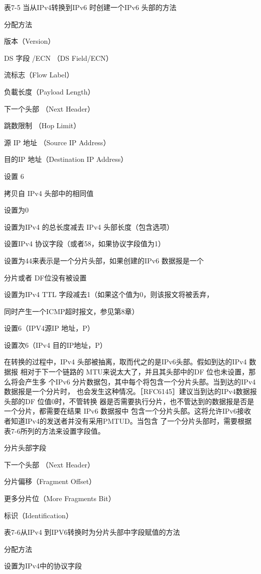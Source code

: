 表7-5 当从IPv4转换到IPv6 时创建一个IPv6 头部的方法

分配方法

版本（Version）

DS 字段 /ECN （DS Field/ECN）

流标志（Flow Label）

负載长度（Payload Length）

下一个头部 （Next Header）

跳数限制 （Hop Limit）

源 IP 地址 （Source IP Address）

目的IP 地址（Destination IP Address）

设置 6

拷贝自 IPv4 头部中的相同值

设置为0

设置为IPv4 的总长度减去 IPv4 头部长度（包含选项）

设置IPv4 协议字段（或者58，如果协议字段值为1）

设置为44来表示是一个分片头部，如果创建的IPv6 数据报是一个

分片或者 DF位没有被设置

设置为IPv4 TTL 字段减去1（如果这个值为0，则该报文将被丢弃，

同时产生一个ICMP超时报文，参见第8章）

设置6（IPV4源IP 地址，P）

设置次6（IPv4 目的IP地址，P）

在转换的过程中，IPv4 头部被抽离，取而代之的是IPv6头部。假如到达的IPv4 数据报
相对于下一个链路的 MTU来说太大了，并且其头部中的DF 位也未设置，那么将会产生多
个IPv6 分片数据包，其中每个将包含一个分片头部。当到达的IPv4数据报是一个分片时，
也会发生这种情况。［RFC6145］建议当到达的IPv4数据报头部的DF 位值0时，不管转换
器是否需要执行分片，也不管达到的数据报是否是一个分片，都需要在结果 IPv6 数据报中
包含一个分片头部。这将允许IPv6接收者知道IPv4的发送者并没有采用PMTUD。当包含
了一个分片头部时，需要根据表7-6所列的方法来设置字段值。

分片头部字段

下一个头部 （Next Header）

分片偏移（Fragment Offset）

更多分片位（More Fragments Bit）

标识（Identification）

表7-6从IPv4 到IPV6转换时为分片头部中字段赋值的方法

分配方法

设置为IPv4中的协议字段

